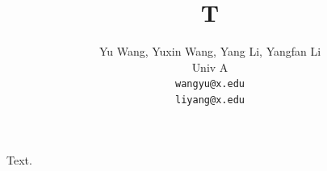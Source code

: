 \documentclass{article}
\title{T}
\author{Yu Wang, Yuxin Wang, Yang Li, Yangfan Li \\ Univ A \\ \texttt{wangyu@x.edu} \\ \texttt{liyang@x.edu}}
\begin{document}
\maketitle
Text.
\end{document}
